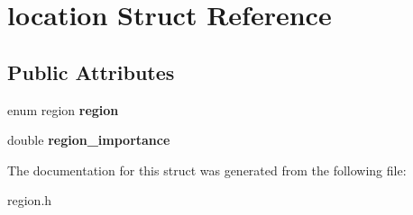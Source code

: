\hypertarget{structlocation}{}\section{location Struct Reference}
\label{structlocation}
\subsection*{Public Attributes}
\begin{DoxyCompactItemize}
\item 
\mbox{\label{structlocation_af54050de86e43d08d5363d06ef198f5d}} 
enum region {\bfseries region}
\item 
\mbox{\label{structlocation_a0e3caadd47e7634ceece3ad4c37419f5}} 
double {\bfseries region\+\_\+importance}
\end{DoxyCompactItemize}


The documentation for this struct was generated from the following file\+:\begin{DoxyCompactItemize}
\item 
region.\+h\end{DoxyCompactItemize}

